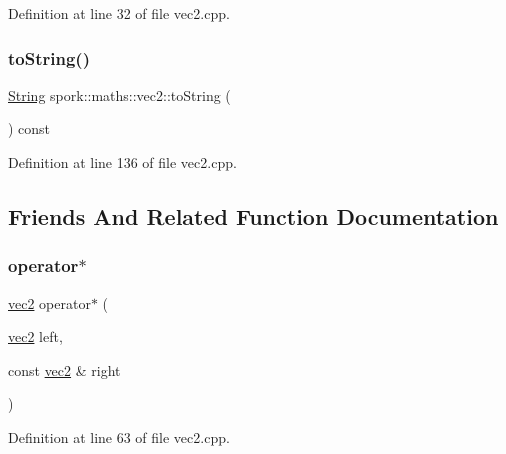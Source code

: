 Definition at line 32 of file vec2.\+cpp.

\mbox{\label{structspork_1_1maths_1_1vec2_a182193d0199a8e80c91491841b403016}} 
\subsubsection{\texorpdfstring{to\+String()}{toString()}}
{\footnotesize\ttfamily \hyperlink{my_string_8h_afbeda3fd1bdc8c37d01bdf9f5c8274ff}{String} spork\+::maths\+::vec2\+::to\+String (\begin{DoxyParamCaption}{ }\end{DoxyParamCaption}) const}



Definition at line 136 of file vec2.\+cpp.



\subsection{Friends And Related Function Documentation}
\mbox{\label{structspork_1_1maths_1_1vec2_a54f52eaceb5eb993f9d3960e55b866a7}} 
\subsubsection{\texorpdfstring{operator$\ast$}{operator*}\hspace{0.1cm}{\footnotesize\ttfamily [1/2]}}
{\footnotesize\ttfamily \hyperlink{structspork_1_1maths_1_1vec2}{vec2} operator$\ast$ (\begin{DoxyParamCaption}\item[{\hyperlink{structspork_1_1maths_1_1vec2}{vec2}}]{left,  }\item[{const \hyperlink{structspork_1_1maths_1_1vec2}{vec2} \&}]{right }\end{DoxyParamCaption})\hspace{0.3cm}{\ttfamily [friend]}}



Definition at line 63 of file vec2.\+cpp.

